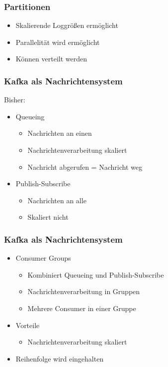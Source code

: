\begin{frame}
\frametitle{Partitionen}
\begin{itemize}
	\item Skalierende Loggrößen ermöglicht
	\item Parallelität wird ermöglicht
	\item Können verteilt werden
\end{itemize}
\end{frame}

\begin{frame}
\frametitle{Kafka als Nachrichtensystem}

Bisher: 
\begin{itemize}
	\item Queueing
	\begin{itemize}
		\item Nachrichten an einen
		\item Nachrichtenverarbeitung skaliert
		\item Nachricht abgerufen = Nachricht weg
	\end{itemize}
	\item Publish-Subscribe
	\begin{itemize}
		\item Nachrichten an alle
		\item Skaliert nicht  			%
	\end{itemize}
\end{itemize}

\end{frame}

\begin{frame}
\frametitle{Kafka als Nachrichtensystem}

\begin{itemize}
	\item Consumer Groups
	\begin{itemize}
		\item Kombiniert Queueing und Publish-Subscribe
		\item Nachrichtenverarbeitung in Gruppen
		\item Mehrere Consumer in einer Gruppe
	\end{itemize}
	\item Vorteile
	\begin{itemize}
		\item Nachrichtenverarbeitung skaliert %
	\end{itemize}
	\item Reihenfolge wird eingehalten 
\end{itemize}

\end{frame}

